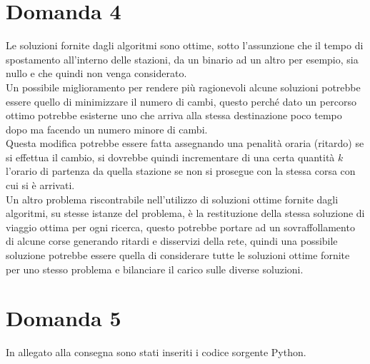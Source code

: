 \documentclass{article}
\begin{document}
\section*{Domanda 4}
Le soluzioni fornite dagli algoritmi sono ottime, sotto l'assunzione che il tempo di spostamento all'interno delle stazioni, da un binario ad un altro per esempio, sia nullo e che quindi non venga considerato.\\
Un possibile miglioramento per rendere più ragionevoli alcune soluzioni potrebbe essere quello di minimizzare il numero di cambi, questo perché dato un percorso ottimo potrebbe esisterne uno che arriva alla stessa destinazione poco tempo dopo ma facendo un numero minore di cambi.\\
Questa modifica potrebbe essere fatta assegnando una penalità oraria (ritardo) se si effettua il cambio, si dovrebbe quindi incrementare di una certa quantità $k$ l'orario di partenza da quella stazione se non si prosegue con la stessa corsa con cui si è arrivati.\\
Un altro problema riscontrabile nell'utilizzo di soluzioni ottime fornite dagli algoritmi, su stesse istanze del problema, è la restituzione della stessa soluzione di viaggio ottima per ogni ricerca, questo potrebbe portare ad un sovraffollamento di alcune corse generando ritardi e disservizi della rete, quindi una possibile soluzione potrebbe essere quella di considerare tutte le soluzioni ottime fornite per uno stesso problema e bilanciare il carico sulle diverse soluzioni.

\section*{Domanda 5}
In allegato alla consegna sono stati inseriti i codice sorgente Python.
\end{document}
